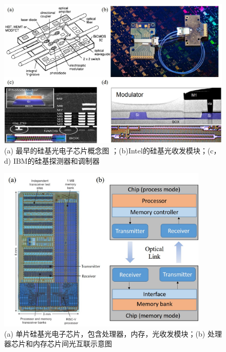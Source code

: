\begin{figure}[htb]
	\centering
	\includegraphics[width=12cm]{./Pictures/figure2.jpg}
	\caption{ (a) 最早的硅基光电子芯片概念图 \cite{Soref1993}；(b)Intel的硅基光收发模块\cite{Paniccia2011}；(c，d) IBM的硅基探测器和调制器\cite{Assefa2012}}
	\label{figure2}
\end{figure}

\begin{figure}[htb]
	\centering
	\includegraphics[width=10cm]{./Pictures/figure3.jpg}
	\caption{ (a) 单片硅基光电子芯片，包含处理器，内存，光收发模块\cite{sun2015single}；(b) 处理器芯片和内存芯片间光互联示意图}
	\label{figure3}
\end{figure}

